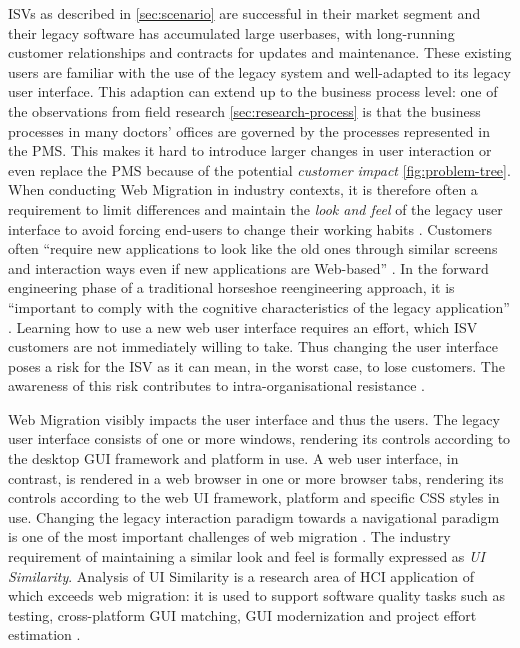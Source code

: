 ISVs as described in \cref{sec:scenario} are successful in their market segment and their legacy software has accumulated large userbases, with long-running customer relationships and contracts for updates and maintenance.
These existing users are familiar with the use of the legacy system and well-adapted to its legacy user interface.
This adaption can extend up to the business process level: one of the observations from field research \cref{sec:research-process} is that the business processes in many doctors' offices are governed by the processes represented in the PMS.
This makes it hard to introduce larger changes in user interaction or even replace the PMS because of the potential \emph{customer impact} \cref{fig:problem-tree}.
When conducting Web Migration in industry contexts, it is therefore often a requirement to limit differences and maintain the \emph{look and feel} of the legacy user interface to avoid forcing end-users to change their working habits \autocite{Lucia2008,Lucia2006,Distante2002}.
Customers often ``require new applications to look like the old ones through similar screens and interaction ways even if new
applications are Web-based'' \autocite{Remics2013RecoverToolkit}.
In the forward engineering phase of a traditional horseshoe reengineering approach, it is ``important to comply with the cognitive characteristics of the legacy application'' \autocite{Distante2006a}.
Learning how to use a new web user interface requires an effort, which ISV customers are not immediately willing to take.
Thus changing the user interface poses a risk for the ISV as it can mean, in the worst case, to lose customers.
The awareness of this risk contributes to intra-organisational resistance \autocite{Khadka2014ProfessionalsModernization}.

Web Migration visibly impacts the user interface and thus the users.
The legacy user interface consists of one or more windows, rendering its controls according to the desktop GUI framework and platform in use.
A web user interface, in contrast, is rendered in a web browser in one or more browser tabs, rendering its controls according to the web UI framework, platform and specific CSS styles in use.
Changing the legacy interaction paradigm towards a navigational paradigm is one of the most important challenges of web migration \autocite{Distante2002}.
The industry requirement of maintaining a similar look and feel \autocite{Lucia2008,Lucia2006,Distante2002} is formally expressed as \emph{UI Similarity}.
Analysis of UI Similarity is a research area of HCI application of which exceeds web migration: it is used to support software quality tasks such as testing, cross-platform GUI matching, GUI modernization and project effort estimation \autocite{Grechanik2018}.

